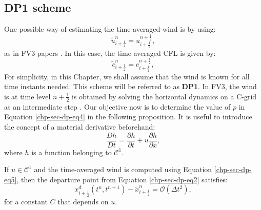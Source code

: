 \subsection{DP1 scheme}
\label{chp-adv1d-sec-DP1}
One possible way of estimating the time-averaged wind is by using:
\begin{equation}
	\label{chp-sec-dp-eq5}
	\tilde{u}^n_{i+\frac{1}{2}} = u^{n+\frac{1}{2}}_{i+\frac{1}{2}},
\end{equation}
as in FV3 papers \citep{lin:1996,putman:2007}. 
In this case, the time-averaged CFL is given by:
\begin{equation}
	\label{chp-sec-dp-eq5b}
	\tilde{c}^n_{i+\frac{1}{2}} = c^{n+\frac{1}{2}}_{i+\frac{1}{2}},
\end{equation}
For simplicity, in this Chapter, we shall assume that the wind is known for all time instants needed.
This scheme will be referred to as \textbf{DP1}.
In FV3, the wind is at time level $n+\frac{1}{2}$ is obtained by solving the horizontal dynamics on a C-grid as an intermediate step \citep{lin:1997,lin:2004}.
Our objective now is to determine the value of $p$ in Equation \eqref{chp-sec-dp-eq4}
in the following proposition. It is useful to introduce the concept of a material derivative beforehand:
\begin{equation*}
	\frac{Dh}{Dt} = \frac{\partial h}{\partial t} + u\frac{\partial h}{\partial x},
\end{equation*}
where $h$ is a function belonging to $\mathcal{C}^1$.
\begin{prop}
	\label{chp-sec-flux:dp_euler}
	If $u\in \mathcal{C}^1$ and the time-averaged wind is computed using Equation \eqref{chp-sec-dp-eq5}, then the departure point from Equation \eqref{chp-sec-dp-eq2} satisfies:
	\begin{equation}
         x_{i+\frac{1}{2}}^d(t^n,t^{n+1}) - \tilde{x}_{i+\frac{1}{2}}^n = \mathcal{O}(\Delta t^2),
	\end{equation}
	for a constant $C$ that depends on $u$.
\end{prop}
